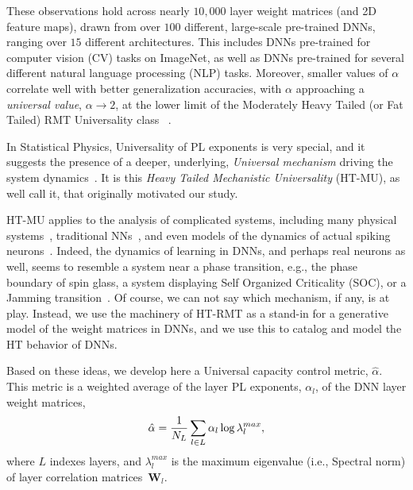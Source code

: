 These observations hold across nearly $10,000$ layer weight matrices (and 2D feature maps), drawn from over $100$ different, large-scale pre-trained DNNs, ranging over $15$ different architectures.
This includes DNNs pre-trained for computer vision (CV) tasks on ImageNet, as well as DNNs pre-trained for several different natural language processing (NLP) tasks.
Moreover, smaller values of $\alpha$ correlate well with better generalization accuracies, with $\alpha$ approaching a \emph{universal value}, $\alpha\rightarrow 2$, at the lower limit of the Moderately Heavy Tailed (or Fat Tailed) RMT Universality class~\cite{MM18_TR,MM19_HTSR_ICML} .  

In Statistical Physics, Universality of PL exponents is very special, and it suggests the presence of a deeper, underlying, \emph{Universal mechanism} driving the system dynamics~\cite{SornetteBook,BouchaudPotters03}.
It is this \emph{Heavy Tailed Mechanistic Universality} (HT-MU), as well call it, that originally motivated our study.  

HT-MU applies to the analysis of complicated systems, including many physical systems~\cite{SornetteBook}, traditional NNs~\cite{EB01_BOOK,nishimori01}, and even models of the dynamics of actual spiking neurons~\cite{FIBX12}.
Indeed, the dynamics of learning in DNNs, and perhaps real neurons as well, seems to resemble a system near a phase transition, e.g., the phase boundary of spin glass, a system displaying Self Organized Criticality (SOC), or a Jamming transition~\cite{GSdx18_TR,SGd18_TR}. 
Of course, we can not say which mechanism, if any, is at play. 
Instead, we use the machinery of  HT-RMT as a stand-in for a generative model of the weight matrices in DNNs, and we use this to catalog and model the HT behavior of DNNs.%

Based on these ideas, we develop here a Universal capacity control metric, $\hat{\alpha}$.
This metric is a weighted average of the layer PL exponents, $\alpha_{l}$, of the DNN layer weight matrices,
\vspace{-2mm}
\begin{equation}
\hat{\alpha}=\dfrac{1}{N_L}\sum_{l\in L}\alpha_{l}\log\lambda_{l}^{max}  ,
\label{eqn:alpha_hat_specific}
\vspace{-1mm}
\end{equation}
where $L$ indexes layers, and 
$\lambda_{l}^{max}$ is the maximum eigenvalue (i.e., Spectral norm) of layer correlation matrices~$\mathbf{W}_{l}$. 

\vspace{-2mm}
